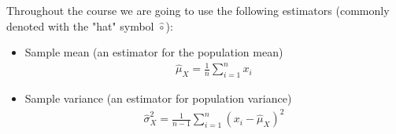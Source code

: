 Throughout the course we are going to use the following estimators (commonly denoted with the "hat" symbol $\hat{\circ}$):
\begin{itemize}
    \item Sample mean (an estimator for the population mean)
    \begin{eqnarray*}
    \hat{\mu}_X = \frac{1}{n} \sum_{i=1}^n x_i
    \end{eqnarray*}
    \item Sample variance (an estimator for population variance)
    \begin{eqnarray*}
    \hat{\sigma}_X^2 = \frac{1}{n-1} \sum_{i=1}^n (x_i-\hat{\mu}_X)^2
    \end{eqnarray*}
\end{itemize}
